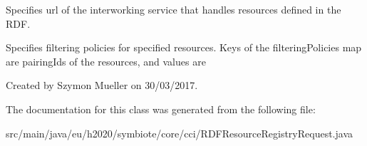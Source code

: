 Specifies url of the interworking service that handles resources defined in the R\+DF.

Specifies filtering policies for specified resources. Keys of the filtering\+Policies map are pairing\+Ids of the resources, and values are

Created by Szymon Mueller on 30/03/2017. 

The documentation for this class was generated from the following file\+:\begin{DoxyCompactItemize}
\item 
src/main/java/eu/h2020/symbiote/core/cci/R\+D\+F\+Resource\+Registry\+Request.\+java\end{DoxyCompactItemize}
